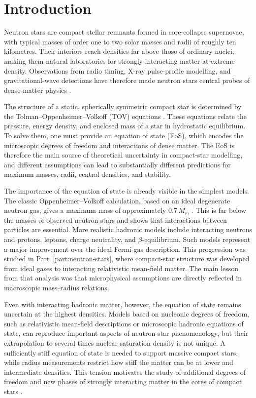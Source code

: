 \chapter{Introduction}
\label{chap:introduction2}

Neutron stars are compact stellar remnants formed in core-collapse supernovae,
with typical masses of order one to two solar masses and radii of roughly ten
kilometres. Their interiors reach densities far above those of ordinary nuclei,
making them natural laboratories for strongly interacting matter at extreme
density. Observations from radio timing, X-ray pulse-profile modelling, and
gravitational-wave detections have therefore made neutron stars central probes
of dense-matter physics \cite{LattimerPrakash2004,glendenning2000,
Riley_2019_J0030,Miller_2019_J0030,Miller_2021_J0740,Riley2021,LIGO2018}.

The structure of a static, spherically symmetric compact star is determined by
the Tolman--Oppenheimer--Volkoff (TOV) equations \cite{tolman1939,oppenheimer1939}. These equations relate the
pressure, energy density, and enclosed mass of a star in hydrostatic
equilibrium. To solve them, one must provide an equation of state (EoS), which encodes the
microscopic degrees of freedom and interactions of dense matter. The EoS is
therefore the main source of theoretical uncertainty in compact-star modelling,
and different assumptions can lead to substantially different predictions for
maximum masses, radii, central densities, and stability.

The importance of the equation of state is already visible in the simplest
models. The classic Oppenheimer--Volkoff calculation, based on an ideal
degenerate neutron gas, gives a maximum mass of approximately
\(0.7\,M_\odot\) \cite{oppenheimer1939}. This is far below the masses of
observed neutron stars and shows that interactions between particles are
essential. More realistic hadronic models include interacting neutrons and
protons, leptons, charge neutrality, and $\beta$-equilibrium. Such models represent
a major improvement over the ideal Fermi-gas description. This progression was
studied in Part~\ref{part:neutron-stars}, where compact-star structure was developed
from ideal gases to interacting relativistic mean-field matter. The main lesson from that analysis was that
microphysical assumptions are directly reflected in macroscopic mass--radius
relations.

Even with interacting hadronic matter, however, the equation of state remains
uncertain at the highest densities. Models based on nucleonic degrees of
freedom, such as relativistic mean-field descriptions or microscopic hadronic
equations of state, can reproduce important aspects of neutron-star
phenomenology, but their extrapolation to several times nuclear saturation
density is not unique. A sufficiently stiff equation of state is needed to
support massive compact stars, while radius measurements
restrict how stiff the matter can be at lower and intermediate
densities. This tension motivates the study of additional degrees of freedom and
new phases of strongly interacting matter in the cores of compact stars
\cite{Baym2018,Annala2020}.

